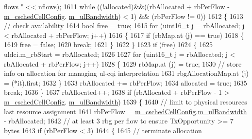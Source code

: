 \begin{DoxyCode}
{       flows "} << nflows);
1611       \textcolor{keywordflow}{while} ((!allocated)&&((rbAllocated + rbPerFlow - \hyperlink{classns3_1_1FdBetFfMacScheduler_a52a10018d36c6a2e69820346a327dfc9}{m\_cschedCellConfig}.
      \hyperlink{structns3_1_1FfMacCschedSapProvider_1_1CschedCellConfigReqParameters_a5ab5b102878e6e7e7727a14af4a64d2f}{m\_ulBandwidth}) < 1) && (rbPerFlow != 0))
1612         \{
1613           \textcolor{comment}{// check availability}
1614           \textcolor{keywordtype}{bool} free = \textcolor{keyword}{true};
1615           \textcolor{keywordflow}{for} (uint16\_t j = rbAllocated; j < rbAllocated + rbPerFlow; j++)
1616             \{
1617               \textcolor{keywordflow}{if} (rbMap.at (j) == \textcolor{keyword}{true})
1618                 \{
1619                   free = \textcolor{keyword}{false};
1620                   \textcolor{keywordflow}{break};
1621                 \}
1622             \}
1623           \textcolor{keywordflow}{if} (free)
1624             \{
1625               uldci.m\_rbStart = rbAllocated;
1626 
1627               \textcolor{keywordflow}{for} (uint16\_t j = rbAllocated; j < rbAllocated + rbPerFlow; j++)
1628                 \{
1629                   rbMap.at (j) = \textcolor{keyword}{true};
1630                   \textcolor{comment}{// store info on allocation for managing ul-cqi interpretation}
1631                   rbgAllocationMap.at (j) = (*it).first;
1632                 \}
1633               rbAllocated += rbPerFlow;
1634               allocated = \textcolor{keyword}{true};
1635               \textcolor{keywordflow}{break};
1636             \}
1637           rbAllocated++;
1638           \textcolor{keywordflow}{if} (rbAllocated + rbPerFlow - 1 > \hyperlink{classns3_1_1FdBetFfMacScheduler_a52a10018d36c6a2e69820346a327dfc9}{m\_cschedCellConfig}.
      \hyperlink{structns3_1_1FfMacCschedSapProvider_1_1CschedCellConfigReqParameters_a5ab5b102878e6e7e7727a14af4a64d2f}{m\_ulBandwidth})
1639             \{
1640               \textcolor{comment}{// limit to physical resources last resource assignment}
1641               rbPerFlow = \hyperlink{classns3_1_1FdBetFfMacScheduler_a52a10018d36c6a2e69820346a327dfc9}{m\_cschedCellConfig}.\hyperlink{structns3_1_1FfMacCschedSapProvider_1_1CschedCellConfigReqParameters_a5ab5b102878e6e7e7727a14af4a64d2f}{m\_ulBandwidth} - rbAllocated;
1642               \textcolor{comment}{// at least 3 rbg per flow to ensure TxOpportunity >= 7 bytes}
1643               \textcolor{keywordflow}{if} (rbPerFlow < 3)
1644                 \{
1645                   \textcolor{comment}{// terminate allocation}

\end{DoxyCode}
